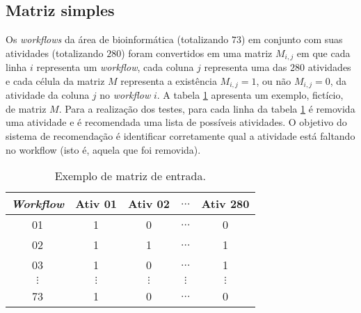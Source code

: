 \documentclass[10pt]{article}
\begin{document}
\subsection*{Matriz simples}
Os \emph{workflows} da área de bioinformática (totalizando \(73\)) em conjunto com suas atividades (totalizando \(280\)) foram convertidos em uma matriz \(M_{i,j}\) em que cada linha \(i\) representa um \emph{workflow}, cada coluna \(j\) representa uma das \(280\) atividades e cada célula da matriz \(M\) representa a existência \(M_{i,j} = 1\), ou não \(M_{i,j} = 0\), da atividade da coluna \(j\) no \emph{workflow} \(i\). A tabela \ref{tabela_matriz_de_dados} apresenta um exemplo, fictício, de matriz \(M\). Para a realização dos testes, para cada linha da tabela \ref{tabela_matriz_de_dados} é removida uma atividade e é recomendada uma lista de possíveis atividades. O objetivo do sistema de recomendação é identificar corretamente qual a atividade está faltando no workflow (isto é, aquela que foi removida). 
\begin{table}[htb]
	\centering
	\caption{Exemplo de matriz de entrada.}
	\begin{tabular}{|c|c|c|c|c|}  \hline
		\textbf{\emph{Workflow}} & \textbf{Ativ \(\mathbf{01}\)} & \textbf{Ativ \(\mathbf{02}\)} & \textbf{\(\mathbf{\ldots}\)} & \textbf{Ativ \(\mathbf{280}\)}  \\ \hline
		01 			  & 1 			  & 0 			  & \(\ldots\) 	  & 0  				\\ \hline
		02 			  & 1 			  & 1 			  & \(\ldots\) 	  & 1  				\\ \hline
		03 			  & 1 			  & 0 			  & \(\ldots\) 	  & 1  				\\ \hline
		\(\vdots\) 		  			  & \(\vdots\) 	  & \(\vdots\) 	  & \(\vdots\) 	  & \(\vdots\) 		\\ \hline
		73 			  & 1 			  & 0 			  & \(\ldots\) 	  & 0  				\\ \hline
	\end{tabular}
	\label{tabela_matriz_de_dados}
	\vspace{0.1cm}
\end{table}
\end{document}
